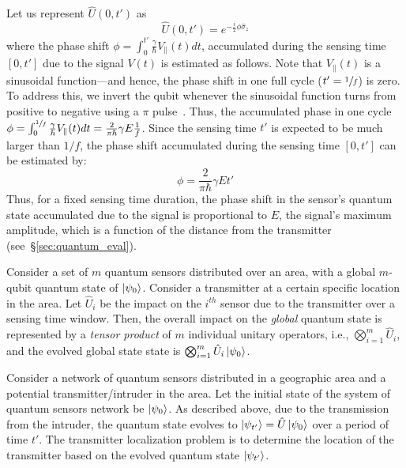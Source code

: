 Let us represent $\hat{U}(0, t')$ as~\cite{nature21_phase,Zhang_2021}
\begin{equation}
    \hat{U}(0, t') = e^{-\frac{i}{2} \phi  \hat{\sigma}_z} \label{eqn:unitary}
\end{equation}
where the phase shift $\phi  =  \int_{0}^{t'} \frac{\gamma}{\hbar} V_{\parallel}(t) dt$, 
accumulated during the sensing time $[0, t']$ due to the signal $V(t)$ is estimated as follows.
Note that $V_{\parallel}(t)$ is a sinusoidal function---and hence, the phase shift in
one full cycle ($t' =\sfrac{1}{f}$) is zero. To address this, we invert the qubit whenever the sinusoidal function turns from positive to negative using a $\pi$ pulse~\cite{RevModPhys.quantumsensing}.
Thus, the accumulated phase in one cycle $\phi = \int_{0}^{\sfrac{1}{f}} \frac{\gamma}{\hbar} V_{\parallel}(t) dt = \frac{2}{\pi \hbar} \gamma E \frac{1}{f}$.
Since the sensing time $t'$ is expected to be much larger than $1/f$, the phase
shift accumulated during the sensing time $[0, t']$ can be estimated by:
\begin{equation}
    \phi =  \frac{2}{\pi \hbar} \gamma E t'
    \label{eqn:phase_shift}
\end{equation}
Thus, for a fixed sensing time duration, the phase shift in the sensor's quantum state
accumulated due to the signal is proportional to $E$, the signal's maximum amplitude, 
which is a function of the distance from the transmitter (see~\S\ref{sec:quantum_eval}). 

Consider a set of $m$ quantum sensors distributed over an area, with a global $m$-qubit quantum state of $\ket{\psi_0}$. 
Consider a transmitter at a certain specific location in the area. 
Let $\hat{U}_i$ be
the impact on the $i^{th}$ sensor due to the transmitter over a sensing time window. 
Then, the overall impact on the {\em global} quantum state is represented by a \emph{tensor product}  of $m$ individual unitary operators, i.e., $\bigotimes_{i=1}^{m} \hat{U}_i$, and
the evolved global state state is $\bigotimes_{i=1}^{m} \hat{U}_i\ket{\psi_0}$. 

Consider a network of quantum sensors distributed in a geographic area 
and a potential transmitter/intruder in the area.
Let the initial state of the system of quantum sensors network 
be $\ket{\psi_{0}}$. 
As described above, due to the transmission from the intruder, the quantum state evolves to $\ket{\psi_{t'}} = \hat{U} \ket{\psi_{0}}$ over a period of time $t'$.
The transmitter localization problem is to determine the location of the transmitter based on
the evolved quantum state $\ket{\psi_{t'}}$.


